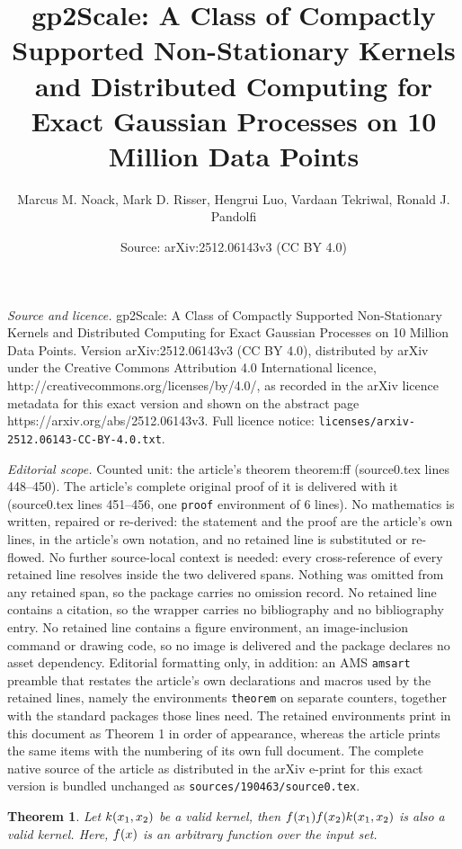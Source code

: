 \documentclass[10pt,a4paper]{amsart}
\title{gp2Scale: A Class of Compactly Supported Non-Stationary Kernels and Distributed Computing for Exact Gaussian Processes on 10 Million Data Points}
\author{Marcus M. Noack, Mark D. Risser, Hengrui Luo, Vardaan Tekriwal, Ronald J. Pandolfi}
\date{Source: arXiv:2512.06143v3 (CC BY 4.0)}
\newtheorem{theorem}{Theorem}
\renewcommand{\mathbf}[1]{%
  \ifx#1x x\else \textbf{#1}\fi
}
\begin{document}
\maketitle

\noindent\emph{Source and licence.} gp2Scale: A Class of Compactly Supported Non-Stationary Kernels and Distributed Computing for Exact Gaussian Processes on 10 Million Data Points. Version arXiv:2512.06143v3 (CC BY 4.0), distributed by arXiv under the Creative Commons Attribution 4.0 International licence, http://creativecommons.org/licenses/by/4.0/, as recorded in the arXiv licence metadata for this exact version and shown on the abstract page https://arxiv.org/abs/2512.06143v3. Full licence notice: \texttt{licenses/arxiv-2512.06143-CC-BY-4.0.txt}.\par\smallskip

\noindent\textit{Editorial scope.} Counted unit: the article's theorem theorem:ff (source0.tex lines 448--450). The article's complete original proof of it is delivered with it (source0.tex lines 451--456, one \texttt{proof} environment of 6 lines). No mathematics is written, repaired or re-derived: the statement and the proof are the article's own lines, in the article's own notation, and no retained line is substituted or re-flowed.  No further source-local context is needed: every cross-reference of every retained line resolves inside the two delivered spans.  Nothing was omitted from any retained span, so the package carries no omission record.  No retained line contains a citation, so the wrapper carries no bibliography and no bibliography entry.  No retained line contains a figure environment, an image-inclusion command or drawing code, so no image is delivered and the package declares no asset dependency.  Editorial formatting only, in addition: an AMS \texttt{amsart} preamble that restates the article's own declarations and macros used by the retained lines, namely the environments \texttt{theorem} on separate counters, together with the standard packages those lines need.  The retained environments print in this document as Theorem 1 in order of appearance, whereas the article prints the same items with the numbering of its own full document.  The complete native source of the article as distributed in the arXiv e-print for this exact version is bundled unchanged as \texttt{sources/190463/source0.tex}.
\begin{theorem}\label{theorem:ff}
Let $k(\mathbf{x}_1,\mathbf{x}_2)$ be a valid kernel, then $f(\mathbf{x}_1)f(\mathbf{x}_2)k(\mathbf{x}_1,\mathbf{x}_2)$ is also a valid kernel. Here, $f(\mathbf{x})$ is an arbitrary function over the input set.
\end{theorem}
\end{document}
